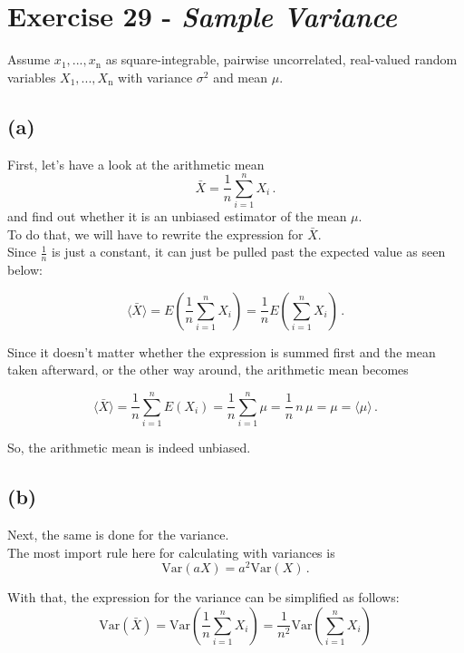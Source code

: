 \section{Exercise 29 - \textit{Sample Variance}}
\label{sec:ex29}

Assume $x_1, ..., x_\text{n}$ as square-integrable, pairwise uncorrelated, real-valued random variables $X_1, ..., X_\text{n}$ with variance $\sigma^2$ and mean $\mu$.

\subsection*{(a)}

First, let's have a look at the arithmetic mean
\begin{equation*}
    \bar{X} = \dfrac{1}{n} \sum_{i=1}^n X_i \,.
\end{equation*}
and find out whether it is an unbiased estimator of the mean $\mu$. \\

To do that, we will have to rewrite the expression for $\bar{X}$. \\
Since $\frac{1}{n}$ is just a constant, it can just be pulled past the expected value as seen below:

\begin{equation*}
    \langle \bar{X} \rangle =  E \left(\dfrac{1}{n} \sum_{i=1}^n X_i \right) = \dfrac{1}{n} E \left(\sum_{i=1}^n X_i \right) \,.
\end{equation*}

Since it doesn't matter whether the expression is summed first and the mean taken afterward, or the other way around, the arithmetic mean becomes

\begin{equation*}
    \langle \bar{X} \rangle = \dfrac{1}{n} \sum_{i=1}^n E(X_i) = \dfrac{1}{n} \sum_{i=1}^n \mu  = \dfrac{1}{n} \, n \, \mu = \mu = \langle \mu \rangle \,.
\end{equation*}

So, the arithmetic mean is indeed unbiased.

\subsection*{(b)}

Next, the same is done for the variance. \\
The most import rule here for calculating with variances is
\begin{equation*}
    \text{Var}(aX) = a^2 \text{Var}(X) \,.
\end{equation*}

With that, the expression for the variance can be simplified as follows:
\begin{equation*}
    \text{Var}(\bar{X}) = \text{Var} \left(\dfrac{1}{n} \sum_{i=1}^n X_i \right) = \dfrac{1}{n^2} \text{Var} \left(\sum_{i=1}^n X_i \right)
\end{equation*}


